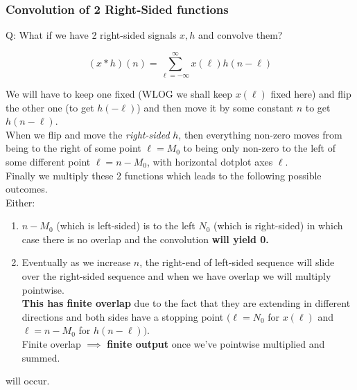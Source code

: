 \subsubsection{Convolution of 2 Right-Sided functions}
\begin{shaded}
Q: What if we have 2 right-sided signals $x, h$ and convolve them?
\end{shaded}

\[
    (x\ast h)(n) = \sum_{\ell=-\infty}^\infty x(\ell) h(n-\ell)
\]

We will have to keep one fixed (WLOG we shall keep $x(\ell)$ fixed here) and flip the other one (to get $h(-\ell)$) and then move it by some constant $n$ to get $h(n-\ell)$. \\
When we flip and move the \textit{right-sided} $h$, then everything non-zero moves from being to the right of some point $\ell=M_0$ to being only non-zero to the left of some different point $\ell=n-M_0$, with horizontal dotplot axes $\ell$. \\
Finally we multiply these 2 functions which leads to the following possible outcomes.\\
Either:
\begin{enumerate}
    \item $n-M_0$ (which is left-sided) is to the left $N_0$ (which is right-sided) in which case there is no overlap and the convolution \textbf{will yield 0.}
    \item Eventually as we increase $n$, the right-end of left-sided sequence will slide over the right-sided sequence and when we have overlap we will multiply pointwise.\\
    \textbf{This has finite overlap} due to the fact that they are extending in different directions and both sides have a stopping point $\Big(\ell=N_0$ for $x(\ell)$ and $\ell=n-M_0$ for $h(n-\ell)\Big)$.\\
    Finite overlap $\implies$ \textbf{finite output} once we've pointwise multiplied and summed.
\end{enumerate}
will occur.


